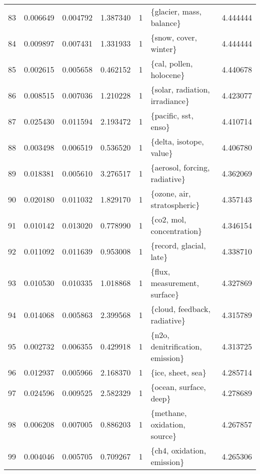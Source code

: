 \begin{tabular}{lrrrrlr}
83 &    0.006649 &  0.004792 &        1.387340 &           1 &                \{glacier, mass, balance\} &  4.444444 \\
84 &    0.009897 &  0.007431 &        1.331933 &           1 &                   \{snow, cover, winter\} &  4.444444 \\
85 &    0.002615 &  0.005658 &        0.462152 &           1 &                 \{cal, pollen, holocene\} &  4.440678 \\
86 &    0.008515 &  0.007036 &        1.210228 &           1 &          \{solar, radiation, irradiance\} &  4.423077 \\
87 &    0.025430 &  0.011594 &        2.193472 &           1 &                    \{pacific, sst, enso\} &  4.410714 \\
88 &    0.003498 &  0.006519 &        0.536520 &           1 &                 \{delta, isotope, value\} &  4.406780 \\
89 &    0.018381 &  0.005610 &        3.276517 &           1 &           \{aerosol, forcing, radiative\} &  4.362069 \\
90 &    0.020180 &  0.011032 &        1.829170 &           1 &             \{ozone, air, stratospheric\} &  4.357143 \\
91 &    0.010142 &  0.013020 &        0.778990 &           1 &               \{co2, mol, concentration\} &  4.346154 \\
92 &    0.011092 &  0.011639 &        0.953008 &           1 &                 \{record, glacial, late\} &  4.338710 \\
93 &    0.010530 &  0.010335 &        1.018868 &           1 &            \{flux, measurement, surface\} &  4.327869 \\
94 &    0.014068 &  0.005863 &        2.399568 &           1 &            \{cloud, feedback, radiative\} &  4.315789 \\
95 &    0.002732 &  0.006355 &        0.429918 &           1 &        \{n2o, denitrification, emission\} &  4.313725 \\
96 &    0.012937 &  0.005966 &        2.168370 &           1 &                       \{ice, sheet, sea\} &  4.285714 \\
97 &    0.024596 &  0.009525 &        2.582329 &           1 &                  \{ocean, surface, deep\} &  4.278689 \\
98 &    0.006208 &  0.007005 &        0.886203 &           1 &            \{methane, oxidation, source\} &  4.267857 \\
99 &    0.004046 &  0.005705 &        0.709267 &           1 &              \{ch4, oxidation, emission\} &  4.265306 \\
\bottomrule
\end{tabular}
